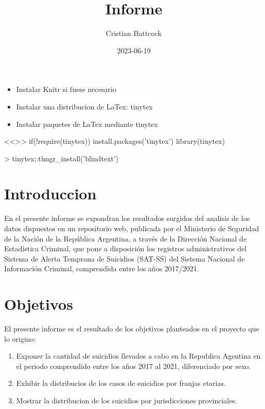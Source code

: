 \documentclass{article}
\title{Informe}
\author{Cristian Battcock}
\date{2023-06-19}
\begin{document}
\maketitle





\begin{itemize}
\item Instalar Knitr si fuese necesario
\item Instalar una distribucion de LaTex: tinytex
\item Instalar paquetes de LaTex mediante tinytex
\end{itemize}

<<>>
if(!require(tinytex)){
    install.packages('tinytex')
    library(tinytex)
}

\begin{Schunk}
\begin{Sinput}
> tinytex::tlmgr_install('blindtext')
\end{Sinput}
\end{Schunk}


\section{Introduccion}
En el presente informe se expondran los resultados surgidos del analisis de los datos dispuestos en un repositorio web, publicada por el Ministerio de Seguridad de la Nación de la República Argentina, a través de la Dirección Nacional de Estadística Criminal, que pone a disposición los registros administrativos del Sistema de Alerta Temprana de Suicidios (SAT-SS) del Sistema Nacional de Información Criminal, comprendida entre los años 2017/2021.


\section{Objetivos}
El presente informe es el resultado de los objetivos planteados en el proyecto que lo origino:
\begin{enumerate}
\item Exponer la cantidad de suicidios llevados a cabo en la Republica Agentina en el periodo comprendido entre los años 2017 al 2021, diferenciado por sexo.
\item Exhibir la distribucios de los casos de suicidios por franjas etarias.
\item Mostrar la distribucion de los suicidios por jurisdicciones provinciales.
\end {enumerate}
\end{document}
